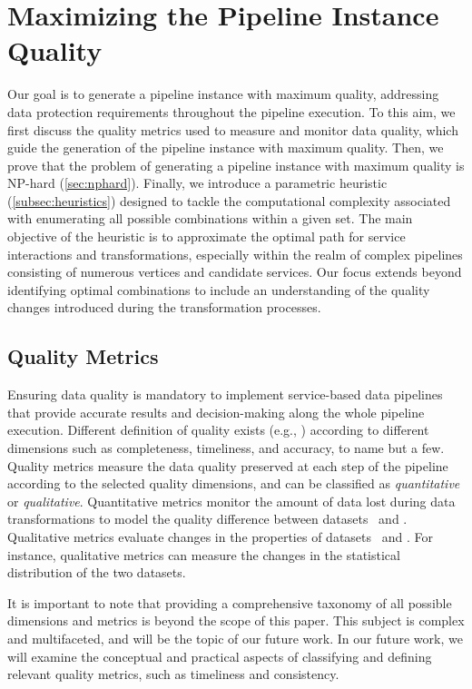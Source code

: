 \section{Maximizing the Pipeline Instance Quality}\label{sec:heuristics}
Our goal is to generate a pipeline instance with maximum quality, addressing data protection requirements throughout the pipeline execution. To this aim, we first discuss the quality metrics used to measure and monitor data quality, which guide the generation of the pipeline instance with maximum quality. Then, we prove that the problem of generating a pipeline instance with maximum quality is NP-hard (\cref{sec:nphard}). Finally, we introduce a parametric heuristic (\cref{subsec:heuristics}) designed to tackle the computational complexity associated with enumerating all possible combinations within a given set. The main objective of the heuristic is to approximate the optimal path for service interactions and transformations, especially within the realm of complex pipelines consisting of numerous vertices and candidate services. Our focus extends beyond identifying optimal combinations to include an understanding of the quality changes introduced during the transformation processes.

\subsection{Quality Metrics}\label{subsec:metrics}
Ensuring data quality is mandatory to implement service-based data pipelines that provide accurate results and decision-making along the whole pipeline execution.
{\color{OurColor} Different definition of quality exists (e.g., \cite{Wang2023,surveyquality}) according to different dimensions such as completeness, timeliness, and accuracy, to name but a few. Quality metrics measure the data quality preserved at each step of the pipeline according to the selected quality dimensions, and can be classified as \emph{quantitative} or \emph{qualitative}.}
Quantitative metrics monitor the amount of data lost during data transformations to model the quality difference between datasets \origdataset\ and \transdataset.
Qualitative metrics evaluate changes in the properties of datasets \origdataset\ and \transdataset. For instance, qualitative metrics can measure the changes in the statistical distribution of the two datasets.

{\color{OurColor2}
It is important to note that providing a comprehensive taxonomy of all possible dimensions and metrics is beyond the scope of this paper. This subject is complex and multifaceted, and will be the topic of our future work. In our future work, we will examine the conceptual and practical aspects of classifying and defining relevant quality metrics, such as timeliness and consistency.
                  }

